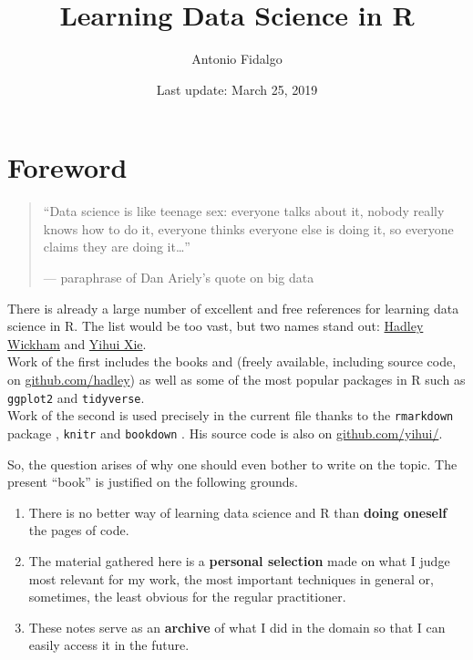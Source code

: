 \documentclass[]{book}
\title{Learning Data Science in R}
\author{Antonio Fidalgo}
\date{Last update: March 25, 2019}
\providecommand{\tightlist}{%
  \setlength{\itemsep}{0pt}\setlength{\parskip}{0pt}}
\theoremstyle{definition}
\theoremstyle{definition}
\theoremstyle{definition}
\theoremstyle{remark}
\begin{document}
\maketitle

{
\setcounter{tocdepth}{1}
\tableofcontents
}
\hypertarget{foreword}{%
\chapter*{Foreword}\label{foreword}}

\begin{quote}
``Data science is like teenage sex: everyone talks about it, nobody
really knows how to do it, everyone thinks everyone else is doing it, so
everyone claims they are doing it\ldots{}''

--- paraphrase of Dan Ariely's quote on big data
\end{quote}

There is already a large number of excellent and free references for
learning data science in R. The list would be too vast, but two names
stand out: \href{http://hadley.nz/}{Hadley Wickham} and
\href{https://yihui.name/en/about/}{Yihui Xie}.\\
Work of the first includes the books \citet{wickham2016} and
\citet{wickham2014} (freely available, including source code, on
\href{https://github.com/hadley}{github.com/hadley}) as well as some of
the most popular packages in R such as \texttt{ggplot2}
\citep{R-ggplot2} and \texttt{tidyverse}\citep{R-tidyverse}.\\
Work of the second is used precisely in the current file thanks to the
\texttt{rmarkdown} package \citep{R-rmarkdown}, \texttt{knitr}
\citep{R-knitr} and \texttt{bookdown} \citep{R-bookdown}. His source
code is also on \href{https://github.com/yihui/}{github.com/yihui/}.

So, the question arises of why one should even bother to write on the
topic. The present ``book'' is justified on the following grounds.

\begin{enumerate}
\def\labelenumi{\arabic{enumi}.}
\tightlist
\item
  There is no better way of learning data science and R than
  \textbf{doing oneself} the pages of code.\\
\item
  The material gathered here is a \textbf{personal selection} made on
  what I judge most relevant for my work, the most important techniques
  in general or, sometimes, the least obvious for the regular
  practitioner.\\
\item
  These notes serve as an \textbf{archive} of what I did in the domain
  so that I can easily access it in the future.
\end{enumerate}
\end{document}
